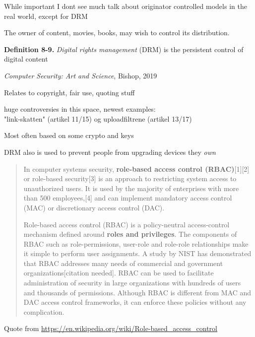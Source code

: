 \documentclass[Screen16to9,17pt]{foils}
\begin{document}
While important I dont see much talk about originator controlled models in the real world, except for DRM


\begin{list1}
\item The owner of content, movies, books, may wish to control its distribution.
\item {\bf Definition 8-9.} \emph{Digital rights management} (DRM) is the persistent control of digital content
\item \emph{Computer Security: Art and Science}, Bishop, 2019
\item Relates to copyright, fair use, quoting stuff
\item huge controversies in this space, newest examples:\\
"link-skatten" (artikel 11/15) og uploadfiltrene (artikel 13/17)
\item Most often based on some crypto and keys
\end{list1}

DRM also is used to prevent people from upgrading devices they \emph{own}




\begin{quote}
In computer systems security, {\bf role-based access control (RBAC)}[1][2] or role-based security[3] is an approach to restricting system access to unauthorized users. It is used by the majority of enterprises with more than 500 employees,[4] and can implement mandatory access control (MAC) or discretionary access control (DAC).

Role-based access control (RBAC) is a policy-neutral access-control mechanism defined around {\bf roles and privileges}. The components of RBAC such as role-permissions, user-role and role-role relationships make it simple to perform user assignments. A study by NIST has demonstrated that RBAC addresses many needs of commercial and government organizations[citation needed]. RBAC can be used to facilitate administration of security in large organizations with hundreds of users and thousands of permissions. Although RBAC is different from MAC and DAC access control frameworks, it can enforce these policies without any complication.
\end{quote}
Quote from \url{https://en.wikipedia.org/wiki/Role-based_access_control}

\end{document}

